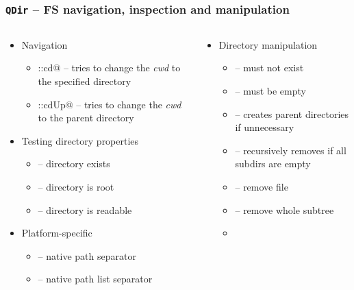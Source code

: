 \begin{frame}[fragile]
  \frametitle{\texttt{QDir} -- FS navigation, inspection and manipulation}
  \footnotesize
  \begin{columns}
    \begin{column}{0.55\textwidth}
    \begin{itemize}
      \item Navigation
      \begin{itemize}
        \item \verb@QDir::cd@ -- tries to change the {\em cwd} to the specified
        directory
        \item \verb@QDir::cdUp@ -- tries to change the {\em cwd} to the parent
        directory
      \end{itemize}
      \item Testing directory properties
      \begin{itemize}
        \item \verb@exists@ -- directory exists
        \item \verb@isRoot@ -- directory is root
        \item \verb@isReadable@ -- directory is readable
      \end{itemize}
      \item Platform-specific
      \begin{itemize}
        \item \verb@separator@ -- native path separator
        \item \verb@listSeparator@ -- native path list separator
      \end{itemize}
    \end{itemize}
    \end{column}
    \begin{column}{0.45\textwidth}
    \begin{itemize}
      \item Directory manipulation
      \begin{itemize}
        \item \verb@mkdir@ -- must not exist
        \item \verb@rmdir@ -- must be empty
        \item \verb@mkpath@ -- creates parent directories if unnecessary
        \item \verb@rmpath@ -- recursively removes if all subdirs are empty
        \item \verb@remove@ -- remove file
        \item \verb@removeRecursively@ -- remove whole subtree
        \item \verb@rename@
      \end{itemize}
    \end{itemize}
    \end{column}
  \end{columns}
\end{frame}

